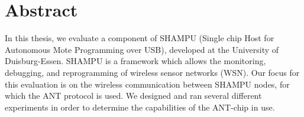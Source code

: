 
\cleardoublepage
\section*{Abstract}
In this thesis, we evaluate a component of SHAMPU (Single chip Host for Autonomous Mote Programming over USB), developed at the University of Duisburg-Essen. 
SHAMPU is a framework which allows the monitoring, debugging, and reprogramming of wireless sensor networks (WSN). 
Our focus for this evaluation is on the wireless communication between SHAMPU nodes, for which the ANT protocol is used. 
We designed and ran several different experiments in order to determine the capabilities of the ANT-chip in use.
\cleardoublepage
